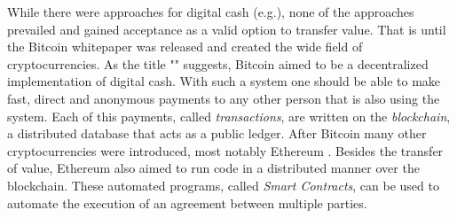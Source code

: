 \documentclass{cacthesis}
\begin{document}
	While there were approaches for digital cash (e.g.\cite{chaum_83}), none of the approaches prevailed and gained acceptance as a valid option to transfer value. That is until the Bitcoin whitepaper \cite{nakamoto_bitcoin_nodate} was released and created the wide field of cryptocurrencies. As the title "" suggests, Bitcoin aimed to be a decentralized implementation of digital cash. With such a system one should be able to make fast, direct and anonymous payments to any other person that is also using the system. Each of this payments, called \emph{transactions}, are written on the \emph{blockchain}, a distributed database that acts as a public ledger. After Bitcoin many other cryptocurrencies were introduced, most notably Ethereum \cite{buterin_ethereum_nodate}. Besides the transfer of value, Ethereum also aimed to run code in a distributed manner over the blockchain. These automated programs, called \emph{Smart Contracts}, can be used to automate the execution of an agreement between multiple parties.\newline
	
\end{document}
